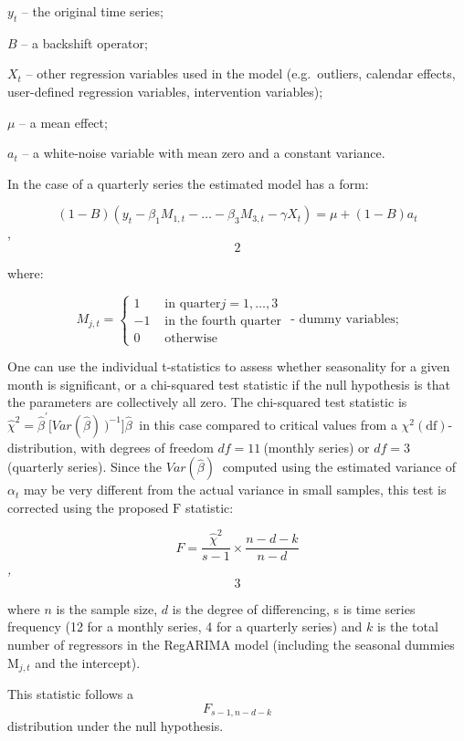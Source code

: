 \documentclass[
]{book}
\begin{document}
\(y_{t}\) -- the original time series;

\(B\) -- a backshift operator;

\(X_{t}\) -- other regression variables used in the model (e.g.~outliers,
calendar effects, user-defined regression variables, intervention
variables);

\(\mu\) -- a mean effect;

\(a_{t}\) -- a white-noise variable with mean zero and a constant
variance.

In the case of a quarterly series the estimated model has a form:

\[\left( 1 - B \right)\left( y_{t} - \beta_{1}M_{1,t} - \ldots - \beta_{3}M_{3,t} - \gamma X_{t} \right) = \mu + (1 - B)a_{t}\], \[2\]

where:

\[
M_{j,t} =
\begin{cases}
1 & \text{ in quarter} j = 1, \ldots, 3 \\
- 1 & \text{ in the fourth quarter}\\
0 & \text{ otherwise}
\end{cases} \text{ - dummy variables;}
\]

One can use the individual t-statistics to assess whether seasonality
for a given month is significant, or a chi-squared test statistic if the
null hypothesis is that the parameters are collectively all zero. The
chi-squared test statistic is
\({\widehat{\chi}}^{2} = {\widehat{\beta}}^{'}{\lbrack Var(\widehat{\beta})}^{\ })^{- 1}\rbrack{\widehat{\beta}}^{\ }\)
in this case compared to critical values from a
\(\chi^{2}\left( \text{df} \right)\)-distribution, with degrees of freedom
\(df = 11\ \)(monthly series) or \(df = 3\) (quarterly series). Since the
\({Var(\widehat{\beta})}^{\ }\) computed using the estimated variance of
\(\alpha_{t}\) may be very different from the actual variance in small
samples, this test is corrected using the proposed
\(\text{F}\) statistic:

\[
  F = \frac{ {\widehat{\chi}}^{2}}{s - 1} \times \frac{n - d - k}{n - d}
  \]\emph{,} \[3\]

where \(n\) is the sample size, \(d\) is the degree of differencing, s is
time series frequency (12 for a monthly series, 4 for a quarterly
series) and \(k\) is the total number of regressors in the RegARIMA model
(including the seasonal dummies \(\text{M}_{j,t}\) and the intercept).

This statistic follows a \[F_{s - 1,n - d - k}\] distribution under the
null hypothesis.
\end{document}
